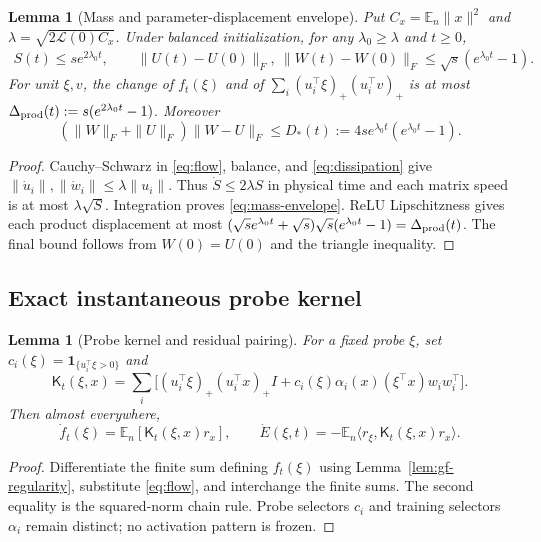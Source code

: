 \documentclass[10pt]{article}
\newtheorem{lemma}[theorem]{Lemma}
\theoremstyle{remark}\newtheorem{remark}[theorem]{Remark}
\begin{document}
\begin{lemma}[Mass and parameter-displacement envelope]\label{sbwindow:mass}
Put $C_x=\mathbb E_n\|x\|^2$ and
$\lambda=\sqrt{2\mathcal L(0)C_x}$. Under balanced initialization, for
any $\lambda_0\ge\lambda$ and $t\ge0$,
\begin{gather}\label{eq:mass-envelope}
 S(t)\le s e^{2\lambda_0t},\qquad
 \|U(t)-U(0)\|_F,\ \|W(t)-W(0)\|_F
 \le\sqrt{s}(e^{\lambda_0t}-1).
\end{gather}
For unit $\xi,v$, the change of $f_t(\xi)$ and of
$\sum_i(u_i^\top\xi)_+(u_i^\top v)_+$ is at most
$\Delta_{\rm prod}(t):=s(e^{2\lambda_0t}-1)$.
Moreover
\[
 (\|W\|_F+\|U\|_F)\|W-U\|_F
 \le D_*(t):=4s e^{\lambda_0t}(e^{\lambda_0t}-1).
\]
\end{lemma}
\begin{proof}
Cauchy--Schwarz in \eqref{eq:flow}, balance, and
\eqref{eq:dissipation} give
$\|\dot u_i\|,\|\dot w_i\|\le\lambda\|u_i\|$.
Thus $\dot S\le2\lambda S$ in physical time and each matrix speed is at most
$\lambda\sqrt S$. Integration proves \eqref{eq:mass-envelope}.
ReLU Lipschitzness gives each product displacement at most
$(\sqrt{s}e^{\lambda_0t}+\sqrt{s})\sqrt{s}(e^{\lambda_0t}-1)=\Delta_{\rm prod}(t)$.
The final bound follows from $W(0)=U(0)$ and the triangle inequality.
\end{proof}

\subsection{Exact instantaneous probe kernel}
\begin{lemma}[Probe kernel and residual pairing]\label{lem:probe-kernel}
For a fixed probe $\xi$, set $c_i(\xi)=\mathbf1_{\{u_i^\top\xi>0\}}$ and
\begin{equation}\label{sbaudit:kernel}
 \mathsf K_t(\xi,x)=\sum_i\big[(u_i^\top\xi)_+(u_i^\top x)_+I
 +c_i(\xi)\alpha_i(x)(\xi^\top x)w_iw_i^\top\big].
\end{equation}
Then almost everywhere,
\begin{equation}\label{sbaudit:alignment}
 \dot f_t(\xi)=\mathbb E_n[\mathsf K_t(\xi,x)r_x],\qquad
 \dot E(\xi,t)=-\mathbb E_n\langle r_\xi,\mathsf K_t(\xi,x)r_x\rangle.
\end{equation}
\end{lemma}
\begin{proof}
Differentiate the finite sum defining $f_t(\xi)$ using
Lemma~\ref{lem:gf-regularity}, substitute \eqref{eq:flow}, and interchange
the finite sums. The second equality is the squared-norm chain rule.
Probe selectors $c_i$ and training selectors $\alpha_i$ remain distinct;
no activation pattern is frozen.
\end{proof}
\end{document}
